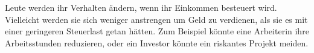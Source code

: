 Leute werden ihr Verhalten ändern, wenn ihr Einkommen besteuert wird.
Vielleicht werden sie sich weniger anstrengen um Geld zu verdienen, als sie es mit einer geringeren Steuerlast getan hätten.
Zum Beispiel könnte eine Arbeiterin ihre Arbeitsstunden reduzieren, oder ein Investor könnte ein riskantes Projekt meiden.